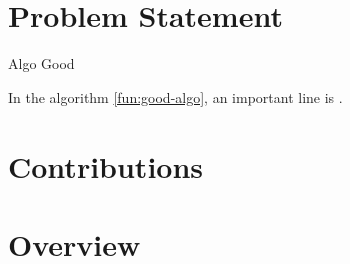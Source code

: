 \section{Problem Statement}

\begin{pseudo}[tbp]
	\caption{Algo Good}
	\label{fun:good-algo}
	\begin{algorithm}[H]
		\PreCode
		
		\StartCode
	\end{algorithm}
\end{pseudo}

In the  algorithm \cref{fun:good-algo}, an important line is .

\section{Contributions}

\section{Overview}